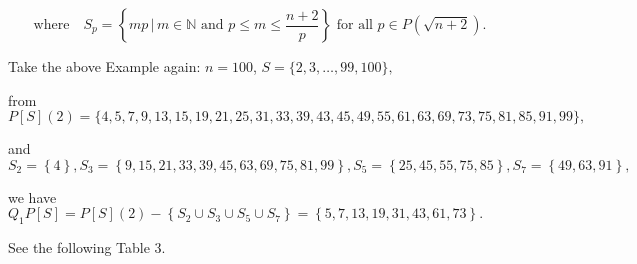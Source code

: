 \documentclass{article}
\begin{document}
\begin{equation}
\text{where} \quad S_{p} = \left\{ mp \, | \, m \in \mathbb{N} \text{ and } p \leq m \leq \frac{n+2}{p} \right\} \text{ for all } p \in P(\sqrt{n+2}).
\end{equation}

\vspace{1\baselineskip}

Take the above Example again:  \( n = 100\),  \( S = \{ 2, 3, \ldots , 99, 100\} ,\)
\vspace{1\baselineskip}

from\ \ \ \ \( P\left[S\right]\left(2\right) = \{ 4,5,7,9,13,15,19,21,25,31,33,39,43,45,49,55,61,63,69,73,75,81,85,91,99\} ,\)
\vspace{1\baselineskip}

and\ \ \ \  \( S_{2} =\left\{ 4\right\} ,  S_{3} =\left\{ 9,15,21,33,39,45,63,69,75,81, 99\right\} ,  S_{5} =\left\{ 25,45,55,75,85\right\} ,  S_{7} =\left\{ 49,63,91\right\} ,\)
\vspace{1\baselineskip}

we have\ \ \ \ \ \ \ \ \(  Q_{1}P\left[S\right] = P\left[S\right](2)-\left\{ S_{2}\cup  S_{3}\cup  S_{5}\cup  S_{7}\right\}  =\left\{ 5, 7, 13, 19, 31, 43, 61, 73\right\} .\)

\vspace{1\baselineskip}

See the following Table 3.
\end{document}
